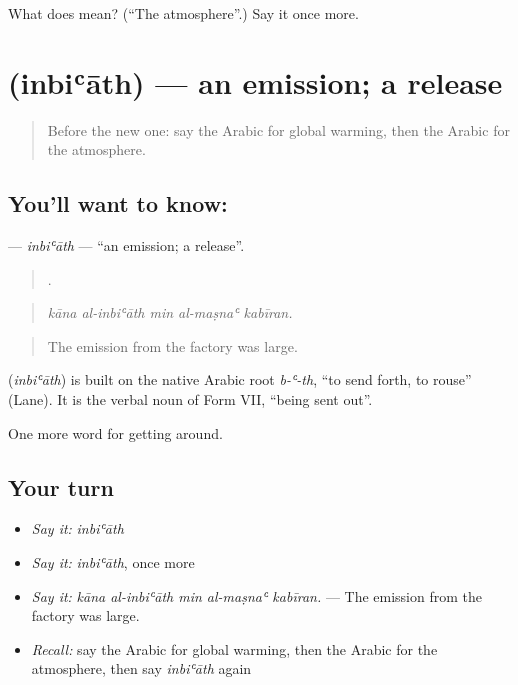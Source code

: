 \begin{tcolorbox}[breakable,colback=teal!4,colframe=teal!35!black,title={Before you move on}]
What does   mean? (\textquotedblleft{}The atmosphere\textquotedblright{}.) Say it once more.
\end{tcolorbox}
\section[\texorpdfstring{\ar{انبعاث} (inbiʿāth)}{انبعاث (inbiʿāth)}]{ (inbiʿāth) — an emission; a release}

\label{lesson:AR-C463-inbiath}



\begin{quote}
Before the new one: say the Arabic for global warming, then the Arabic for the atmosphere.
\end{quote}

\subsection*{You'll want to know: }
\textbf{} — \emph{inbiʿāth} — \textquotedblleft{}an emission; a release\textquotedblright{}.

\begin{quote}
    .
\end{quote}

\begin{quote}
\emph{kāna al-inbiʿāth min al-maṣnaʿ kabīran.}
\end{quote}

\begin{quote}
The emission from the factory was large.
\end{quote}

\begin{cousinweb}
\textbf{} (\emph{inbiʿāth}) is built on the native Arabic root \emph{b-ʿ-th}, \textquotedblleft{}to send forth, to rouse\textquotedblright{} (Lane). It is the verbal noun of Form VII, \textquotedblleft{}being sent out\textquotedblright{}.
\end{cousinweb}

\begin{grammarlens}[title={What you've built}]
One more word for getting around.
\end{grammarlens}

\subsection*{Your turn}
\begin{itemize}
\raggedright
  \item \emph{Say it:} \emph{inbiʿāth}
  \item \emph{Say it:} \emph{inbiʿāth}, once more
  \item \emph{Say it:} \emph{kāna al-inbiʿāth min al-maṣnaʿ kabīran.} — The emission from the factory was large.
  \item \emph{Recall:} say the Arabic for global warming, then the Arabic for the atmosphere, then say \emph{inbiʿāth} again
\end{itemize}

